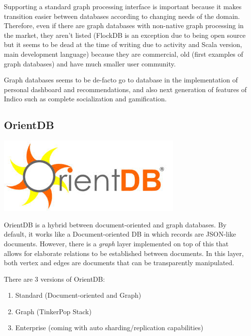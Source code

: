 Supporting a standard graph processing interface is important because it makes transition easier between databases according to changing needs of the domain. Therefore, even if there are graph databases with non-native graph processing in the market, they aren't listed (FlockDB is an exception due to being open source but it seems to be dead at the time of writing due to activity and Scala version, main development language) because they are commercial, old (first examples of graph databases) and have much smaller user community.

Graph databases seems to be de-facto go to database in the implementation of personal dashboard and recommendations, and also next generation of features of Indico such as complete socialization and gamification.

\subsection{OrientDB}

\vspace{-1.15cm} \hspace{3.5cm} \includegraphics[scale=0.2]{3/figures/orientdb.jpg} \vspace{0.3cm}

OrientDB is a hybrid between document-oriented and graph databases. By default, it works like a Document-oriented DB in which records are JSON-like documents. However, there is a \textit{graph} layer implemented on top of this that allows for elaborate relations to be established between documents. In this layer, both vertex and edges are documents that can be transparently manipulated.

There are 3 versions of OrientDB: 
\begin{enumerate}
  \item Standard (Document-oriented and Graph)
  \item Graph (TinkerPop Stack)
  \item Enterprise (coming with auto sharding/replication capabilities)
\end{enumerate}

